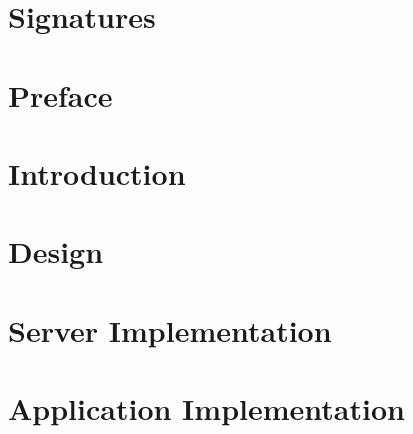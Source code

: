 






\thispagestyle{empty}
\cleardoublepage


\chapter*{Signatures}


\newpage
\thispagestyle{empty}
\mbox{}

\chapter*{Preface}
\thispagestyle{empty}


\newpage
\thispagestyle{empty}
\mbox{}

\newpage
\thispagestyle{empty}
\mbox{}

\newcommand{\appname}{Dishcover}

\setcounter{secnumdepth}{3}
\setcounter{tocdepth}{1}

\tableofcontents*

\acresetall %

\linenumbers %

\chapter{Introduction}\label{chap:intro}







\chapter{Design}\label{chap:design}







\chapter{Server Implementation}


\chapter{Application Implementation}\label{chap:appimplementation}








